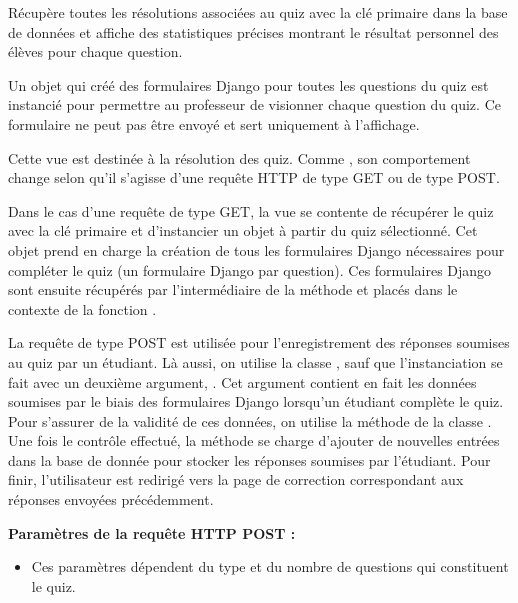 \documentclass[a4paper,11pt,openany,oneside]{sphinxmanual}
\begin{document}

\begin{fulllineitems}
\label{source:quiz.views.advanced_stats}
Récupère toutes les résolutions associées au quiz avec la clé primaire  dans la base de données et affiche
des statistiques précises montrant le résultat personnel des élèves pour chaque question.

Un objet  qui créé des formulaires Django pour toutes les questions
du quiz est instancié pour permettre au professeur de visionner 
chaque question du quiz. Ce formulaire ne peut pas être envoyé et sert
uniquement à l'affichage.

\end{fulllineitems}


\begin{fulllineitems}
\label{source:quiz.views.complete}
Cette vue est destinée à la résolution des quiz. Comme , son comportement
change selon qu'il s'agisse d'une requête HTTP de type GET ou de type POST.

Dans le cas d'une requête de type GET, la vue se contente de récupérer le quiz
avec la clé primaire  et d'instancier un objet  à partir
du quiz sélectionné. Cet objet prend en charge la création de tous les formulaires
Django nécessaires pour compléter le quiz (un formulaire Django par question).
Ces formulaires Django sont ensuite récupérés par l'intermédiaire de la méthode
 et placés dans le contexte de la fonction .

La requête de type POST est utilisée pour l'enregistrement des réponses soumises
au quiz par un étudiant. Là aussi, on utilise la classe , sauf que
l'instanciation se fait avec un deuxième argument, . Cet argument contient
en fait les données soumises par le biais des formulaires Django lorsqu'un
étudiant complète le quiz. Pour s'assurer de la validité de ces données, on
utilise la méthode  de la classe . Une fois le
contrôle effectué, la méthode  se charge d'ajouter de nouvelles
entrées dans la base de donnée pour stocker les réponses soumises par l'étudiant.
Pour finir, l'utilisateur est redirigé vers la page de correction correspondant
aux réponses envoyées précédemment.

\textbf{Paramètres de la requête HTTP POST :}
\begin{itemize}
\item {} 
Ces paramètres dépendent du type et du nombre de questions qui constituent le quiz.

\end{itemize}

\end{fulllineitems}
\end{document}
